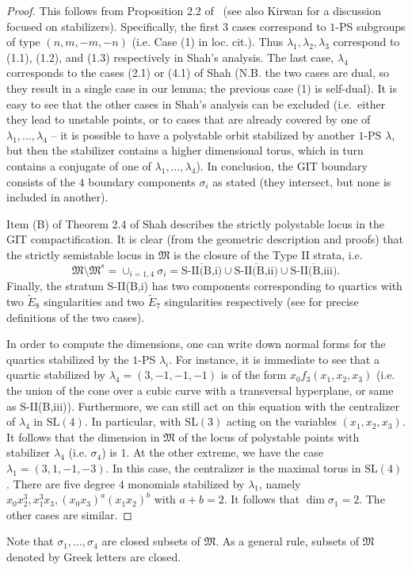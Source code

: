 \documentclass[11pt]{amsart}
\numberwithin{equation}{section}
\theoremstyle{plain}
\theoremstyle{remark}
\theoremstyle{definition}
\newcommand{\SL}{\mathrm{SL}}
\newcommand{\gM}{\mathfrak{M}}
\begin{document}
%
%
\begin{proof}
This follows from Proposition 2.2 of~\cite{shah4} (see also Kirwan \cite[\S4]{kirwanhyp} for a discussion focused on stabilizers). Specifically, the first 3 cases correspond to $1$-PS subgroups of type $(n,m,-m,-n)$ (i.e. Case (1) in loc. cit.). Thus $\lambda_1,\lambda_2,\lambda_3$ correspond to (1.1), (1.2), and (1.3) respectively in Shah's analysis. The last case, $\lambda_4$ corresponds to the cases (2.1) or (4.1) of Shah (N.B. the two cases are dual, so they result in a single case in our lemma; the previous case (1) is self-dual). It is easy to see that the other cases in Shah's analysis can be excluded (i.e.~either they lead to unstable points, or to cases that are already covered by one of $\lambda_1,\dots,\lambda_4$ -- it is possible to have a polystable orbit stabilized by another $1$-PS $\lambda$, but then the stabilizer contains a higher dimensional torus, which in turn contains a conjugate of one of $\lambda_1,\dots,\lambda_4$). In conclusion, the GIT boundary consists of the $4$ boundary components $\sigma_i$ as stated (they intersect, but none is included in another). 

Item (B) of Theorem 2.4 of Shah \cite{shah4} describes the strictly polystable locus in the GIT compactification. It is clear (from the geometric description and proofs) that the strictly semistable locus in $\gM$ is the closure of the Type II strata, i.e. 
$$ \gM\setminus \gM^s=\cup_{i=1,4} \sigma_i=\overline{\textrm{S-II(B,i)}}\cup \overline{\textrm{S-II(B,ii)}}\cup \overline{\textrm{S-II(B,iii)}}.$$
Finally, the stratum S-II(B,i) has two components corresponding to quartics with two $\widetilde E_8$ singularities and two $\widetilde E_7$ singularities respectively (see \cite[Thm. 2.4 (B, II(i))]{shah4} for precise definitions of the two cases). 

In order to compute the dimensions, one can write down normal forms for the quartics stabilized by the $1$-PS $\lambda_i$. For instance, it is immediate to see that a quartic stabilized by $\lambda_4=(3,-1,-1,-1)$ is of the form $x_0f_3(x_1,x_2,x_3)$ (i.e. the union of the cone over a cubic curve with a transversal hyperplane, or same as S-II(B,iii)). Furthermore, we can still act on this equation with the centralizer of $\lambda_4$ in $\SL(4)$. In particular, with $\SL(3)$ acting on the variables $(x_1,x_2,x_3)$. It follows that the dimension in $\gM$ of the locus of polystable points with stabilizer $\lambda_4$ (i.e. $\sigma_4$) is $1$. At the other extreme, we have the case $\lambda_1=(3,1,-1,-3)$. In this case, the centralizer is the maximal torus in $\SL(4)$. There are five degree $4$ monomials  stabilized by $\lambda_1$, namely $x_0x_2^3,x_1^3x_3, (x_0x_3)^a(x_1x_2)^b$ with $a+b=2$.  It follows that $\dim \sigma_1=2$.  The other cases are similar. 
%
\end{proof}
%
Note that $\sigma_1,\ldots,\sigma_4$ are closed subsets of $\gM$. As a general rule, subsets of $\gM$ denoted by Greek letters are closed.
\end{document}
